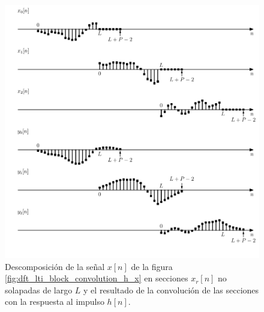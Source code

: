 \documentclass[a4paper]{report}
\begin{document}
\begin{figure}[!htb]
 \begin{center}
 \includegraphics[width=1\textwidth]{figuras/dft_lti_block_convolution_overlap_add.pdf}
 \caption{\label{fig:dft_lti_block_convolution_overlap_add} Descomposición de la señal \(x[n]\) de la figura \ref{fig:dft_lti_block_convolution_h_x} en secciones \(x_r[n]\) no solapadas de largo \(L\) y el resultado de la convolución de las secciones con la respuesta al impulso \(h[n]\).}
 \end{center}
\end{figure}
\end{document}
